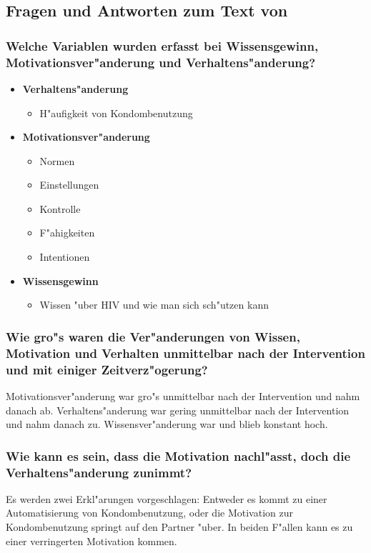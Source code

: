 \subsection{Fragen und Antworten zum Text von \textcite{albarracin_empirical_2006}}
\subsubsection{Welche Variablen wurden erfasst bei Wissensgewinn, Motivationsver"anderung und Verhaltens"anderung?}
\begin{itemize}
        \item \textbf{Verhaltens"anderung}
                \begin{itemize}
                        \item H"aufigkeit von Kondombenutzung
                \end{itemize}
        \item \textbf{Motivationsver"anderung}
                \begin{itemize}
                        \item Normen
                        \item Einstellungen
                        \item Kontrolle
                        \item F"ahigkeiten
                        \item Intentionen
                \end{itemize}
        \item \textbf{Wissensgewinn}
                \begin{itemize}
                        \item Wissen "uber HIV und wie man sich sch"utzen kann 
                \end{itemize}
\end{itemize}

\subsubsection{Wie gro"s waren die Ver"anderungen von Wissen, Motivation und Verhalten unmittelbar nach der Intervention und mit einiger Zeitverz"ogerung?}
Motivationsver"anderung war gro"s unmittelbar nach der Intervention und nahm danach ab. Verhaltens"anderung war gering unmittelbar nach der Intervention und nahm danach zu. Wissensver"anderung war und blieb konstant hoch. 

\subsubsection{Wie kann es sein, dass die Motivation nachl"asst, doch die Verhaltens"anderung zunimmt?}
Es werden zwei Erkl"arungen vorgeschlagen: Entweder es kommt zu einer Automatisierung von Kondombenutzung, oder die Motivation zur Kondombenutzung springt auf den Partner "uber. In beiden F"allen kann es zu einer verringerten Motivation kommen.

